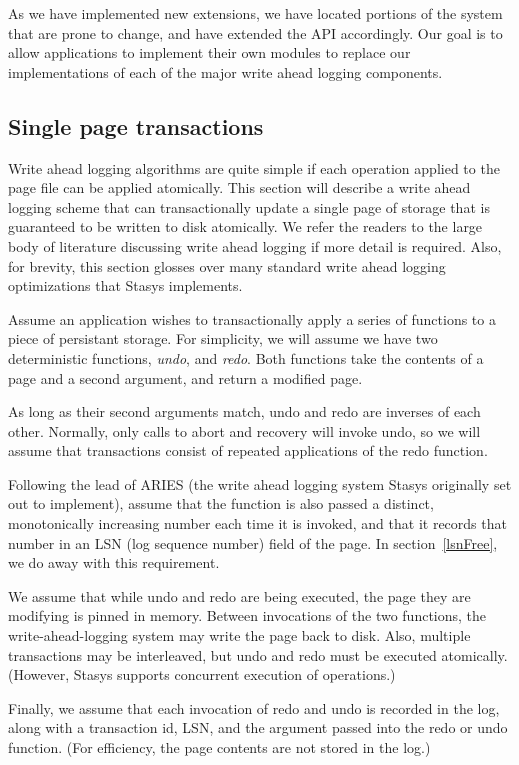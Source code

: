 \documentclass[letterpaper,twocolumn,10pt]{article}
\newcommand{\yad}{Stasys\xspace}
\begin{document}
As we have
implemented new extensions, we have located portions of the system
that are prone to change, and have extended the API accordingly.  Our
goal is to allow applications to implement their own modules to
replace our implementations of each of the major write ahead logging
components.

\subsection{Single page transactions}

Write ahead logging algorithms are quite simple if each operation
applied to the page file can be applied atomically.  This section will
describe a write ahead logging scheme that can transactionally update a single page
of storage that is guaranteed to be written to disk atomically.  We refer
the readers to the large body of literature discussing write ahead
logging if more detail is required.  Also, for brevity, this
section glosses over many standard write ahead logging optimizations that \yad implements.

Assume an application wishes to transactionally apply a series of functions to a piece
of persistant storage.  For simplicity, we will assume we have two
deterministic functions, {\em undo}, and {\em redo}.  Both functions
take the contents of a page and a second argument, and return a modified
page.  

As long as their second arguments match, undo and redo are inverses of
each other.  Normally, only calls to abort and recovery will invoke undo, so
we will assume that transactions consist of repeated applications of
the redo function.

Following the lead of ARIES (the write ahead logging system \yad
originally set out to implement), assume that the function is also
passed a distinct, monotonically increasing number each time it is
invoked, and that it records that number in an LSN (log sequence number)
field of the page.  In section~\ref{lsnFree}, we do away with this requirement.

We assume that while undo and redo are being executed, the
page they are modifying is pinned in memory.  Between invocations of
the two functions, the write-ahead-logging system may write the page
back to disk.  Also, multiple transactions may be interleaved, but
undo and redo must be executed atomically.  (However, \yad supports concurrent execution of operations.)

Finally, we assume that each invocation of redo and undo is recorded
in the log, along with a transaction id, LSN, and the argument passed into the redo or undo function.
(For efficiency, the page contents are not stored in the log.)
\end{document}
